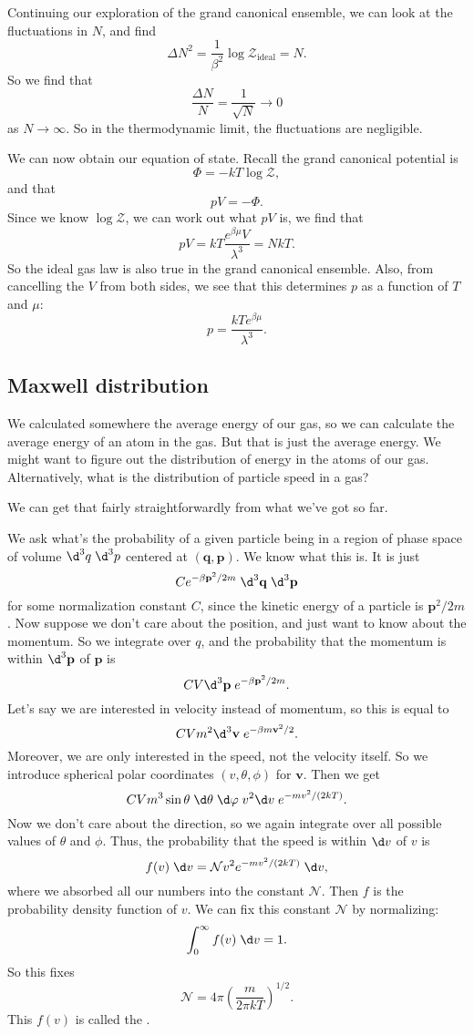 \documentclass[a4paper]{article}
\begin{document}
Continuing our exploration of the grand canonical ensemble, we can look at the fluctuations in $N$, and find
\[
  \Delta N^2 = \frac{1}{\beta^2} \log \mathcal{Z}_{\mathrm{ideal}} = N.
\]
So we find that
\[
  \frac{\Delta N}{N} = \frac{1}{\sqrt{N}} \to 0
\]
as $N \to \infty$. So in the thermodynamic limit, the fluctuations are negligible.

We can now obtain our equation of state. Recall the grand canonical potential is
\[
  \Phi = -kT \log \mathcal{Z},
\]
and that
\[
  pV = -\Phi.
\]
Since we know $\log \mathcal{Z}$, we can work out what $pV$ is, we find that
\[
  pV = kT \frac{e^{\beta \mu}V}{\lambda^3} = NkT.
\]
So the ideal gas law is also true in the grand canonical ensemble. Also, from cancelling the $V$ from both sides, we see that this determines $p$ as a function of $T$ and $\mu$:
\[
  p = \frac{kT e^{\beta\mu}}{\lambda^3}.
\]

\subsection{Maxwell distribution}
We calculated somewhere the average energy of our gas, so we can calculate the average energy of an atom in the gas. But that is just the average energy. We might want to figure out the distribution of energy in the atoms of our gas. Alternatively, what is the distribution of particle speed in a gas?

We can get that fairly straightforwardly from what we've got so far.

We ask what's the probability of a given particle being in a region of phase space of volume $\d^3 q \;\d^3 p$ centered at $(\mathbf{q}, \mathbf{p})$. We know what this is. It is just
\[
  C e^{-\beta \mathbf{p}^2/2m}\;\d^3 \mathbf{q}\;\d^3 \mathbf{p}
\]
for some normalization constant $C$, since the kinetic energy of a particle is $\mathbf{p}^2/2m$. Now suppose we don't care about the position, and just want to know about the momentum. So we integrate over $q$, and the probability that the momentum is within $\d^3 \mathbf{p}$ of $\mathbf{p}$ is
\[
  CV \d^3 \mathbf{p}\; e^{-\beta \mathbf{p}^2/2m}.
\]
Let's say we are interested in velocity instead of momentum, so this is equal to
\[
  CV m^2 \d^3 \mathbf{v}\; e^{-\beta m\mathbf{v}^2/2}.
\]
Moreover, we are only interested in the speed, not the velocity itself. So we introduce spherical polar coordinates $(v, \theta, \phi)$ for $\mathbf{v}$. Then we get
\[
  CV m^3 \sin \theta\; \d \theta\;\d \varphi\;v^2 \d v\;e^{-mv^2/(2kT)}.
\]
Now we don't care about the direction, so we again integrate over all possible values of $\theta$ and $\phi$. Thus, the probability that the speed is within $\d v$ of $v$ is
\[
  f(v)\;\d v = \mathcal{N} v^2 e^{-mv^2/(2kT)} \;\d v,
\]
where we absorbed all our numbers into the constant $\mathcal{N}$. Then $f$ is the probability density function of $v$. We can fix this constant $\mathcal{N}$ by normalizing:
\[
  \int_0^\infty f(v) \;\d v = 1.
\]
So this fixes
\[
  \mathcal{N} = 4\pi \left(\frac{m}{2\pi kT}\right)^{1/2}.
\]
This $f(v)$ is called the .
\end{document}
